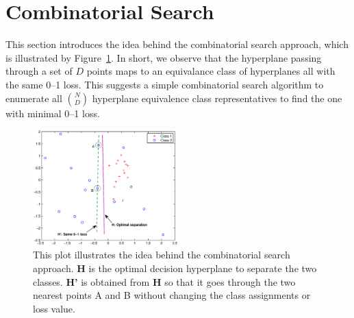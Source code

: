 \section{Combinatorial Search}
\label{cha:combinatorialsearch}

This section introduces the idea behind the combinatorial search
approach, which is illustrated by Figure~\ref{fig:cs_intro}. In short,
we observe that the hyperplane passing through a set of $D$ points
maps to an equivalance class of hyperplanes all with the same 0--1
loss.  This suggests a simple combinatorial search algorithm to
enumerate all $\binom{N}{D}$ hyperplane equivalence class representatives 
to find the one with minimal 0--1 loss.

\begin{figure}[here]
\includegraphics[width=0.50\textwidth]{images/fig41_intro.eps}
\caption{ \footnotesize This plot illustrates the idea behind
  the combinatorial search approach. {\bf H} is the
  optimal decision hyperplane to separate the two classes. {\bf H'} is
  obtained from {\bf H} 
  so that it goes through the two nearest points A and B
  without changing the class assignments or loss value.}
\label{fig:cs_intro}
\end{figure}

